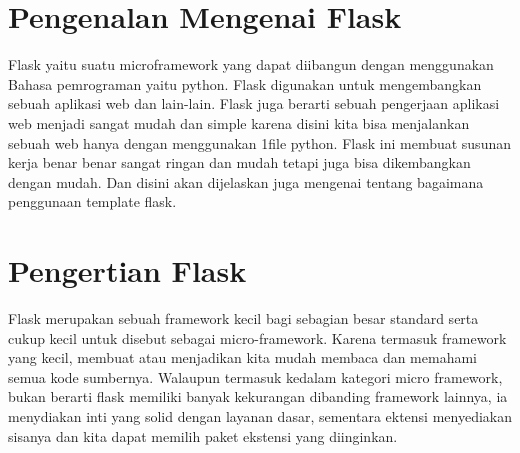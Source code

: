 
\section {Pengenalan Mengenai Flask}
Flask yaitu suatu microframework yang dapat diibangun dengan menggunakan Bahasa pemrograman yaitu python. Flask digunakan untuk mengembangkan sebuah aplikasi web dan lain-lain. Flask juga berarti sebuah pengerjaan aplikasi web menjadi sangat mudah dan simple karena disini kita bisa menjalankan sebuah web hanya dengan menggunakan 1file python. Flask ini membuat susunan kerja benar benar sangat ringan dan mudah tetapi juga bisa dikembangkan dengan mudah.  Dan disini akan dijelaskan juga mengenai tentang bagaimana penggunaan template flask.

\section{Pengertian Flask}
Flask merupakan sebuah framework kecil bagi sebagian besar standard serta cukup kecil untuk disebut sebagai micro-framework. 
Karena termasuk framework yang kecil, membuat atau menjadikan kita mudah membaca dan memahami semua kode sumbernya. 
Walaupun termasuk kedalam kategori micro framework, bukan berarti flask memiliki banyak kekurangan dibanding framework lainnya, ia menydiakan inti yang solid dengan layanan dasar, sementara ektensi menyediakan sisanya dan kita dapat memilih paket ekstensi yang diinginkan.


